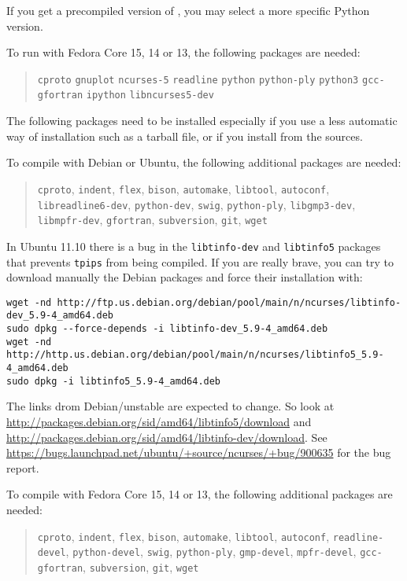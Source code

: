 \documentclass[a4paper]{article}
\begin{document}
If you get a precompiled version of \Apfa, you may select a more specific
Python version.

To run \Apfa with Fedora Core 15, 14 or 13, the following packages are needed:
\begin{quote}
  \texttt{cproto} \texttt{gnuplot} \texttt{ncurses-5}
  \texttt{readline} \texttt{python} \texttt{python-ply}
  \texttt{python3} \texttt{gcc-gfortran} \texttt{ipython} 
  \texttt{libncurses5-dev}
\end{quote}

The following packages need to be installed especially if you use a less
automatic way of installation such as a tarball file, or if you install
from the sources.


To compile \Apfa with Debian or Ubuntu, the following additional
packages are needed:
\begin{quote}
  \texttt{cproto}, \texttt{indent}, \texttt{flex}, \texttt{bison},
  \texttt{automake}, \texttt{libtool}, \texttt{autoconf},
  \texttt{libreadline6-dev}, \texttt{python-dev}, \texttt{swig},
  \texttt{python-ply}, \texttt{libgmp3-dev},
  \texttt{libmpfr-dev}, \texttt{gfortran}, \texttt{subversion},
  \texttt{git}, \texttt{wget}
\end{quote}
In Ubuntu 11.10 there is a bug in the \texttt{libtinfo-dev} and
\texttt{libtinfo5} packages that prevents \texttt{tpips} from being
compiled. If you are really brave, you can try to download manually the
Debian packages and force their installation with: {\small
\begin{verbatim}
wget -nd http://ftp.us.debian.org/debian/pool/main/n/ncurses/libtinfo-dev_5.9-4_amd64.deb
sudo dpkg --force-depends -i libtinfo-dev_5.9-4_amd64.deb
wget -nd http://http.us.debian.org/debian/pool/main/n/ncurses/libtinfo5_5.9-4_amd64.deb
sudo dpkg -i libtinfo5_5.9-4_amd64.deb
\end{verbatim}
}%
The links drom Debian/unstable are expected to change. So look at
\url{http://packages.debian.org/sid/amd64/libtinfo5/download} and
\url{http://packages.debian.org/sid/amd64/libtinfo-dev/download}.  See
\url{https://bugs.launchpad.net/ubuntu/+source/ncurses/+bug/900635} for
the bug report.


To compile \Apfa with Fedora Core 15, 14 or 13, the following additional
packages are needed:
\begin{quote}
  \texttt{cproto}, \texttt{indent}, \texttt{flex}, \texttt{bison},
  \texttt{automake}, \texttt{libtool}, \texttt{autoconf},
  \texttt{readline-devel}, \texttt{python-devel}, \texttt{swig},
  \texttt{python-ply}, \texttt{gmp-devel},
  \texttt{mpfr-devel}, \texttt{gcc-gfortran}, \texttt{subversion},
  \texttt{git}, \texttt{wget}
\end{quote}
\end{document}
